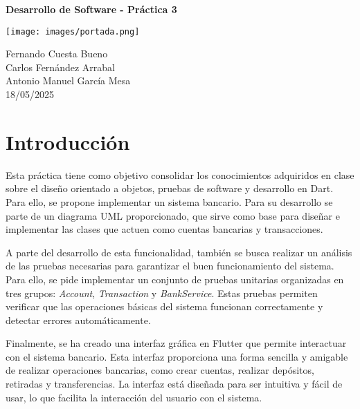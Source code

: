 \documentclass[12pt]{article}
\begin{document}
\begin{titlepage}

    \centering
    \vspace*{1cm}
    \vspace{0.5cm}
    {\Huge\bfseries Desarrollo de Software - Práctica 3\par}
    \vspace{1.5cm}
    \texttt{[image: images/portada.png]}
    \vspace{1.5cm}
    \par %
    \vspace{1cm}
    {\Large Fernando Cuesta Bueno
        \\
        Carlos Fernández Arrabal
        \\
        Antonio Manuel García Mesa
        \\
        18/05/2025\par}

\end{titlepage}

\tableofcontents

\newpage


\section{Introducción}
\setlength{\parindent}{0pt}
Esta práctica tiene como objetivo consolidar los conocimientos adquiridos en clase sobre el diseño orientado a objetos, pruebas de software y desarrollo en Dart. Para ello, se propone implementar un sistema bancario. Para su desarrollo se parte de un diagrama UML proporcionado, que sirve como base para diseñar e implementar las clases que actuen como cuentas bancarias y transacciones.

\vspace{0.2cm}
A parte del desarrollo de esta funcionalidad, también se busca realizar un análisis de las pruebas necesarias para garantizar el buen funcionamiento del sistema. Para ello, se pide implementar un conjunto de pruebas unitarias organizadas en tres grupos: \textit{Account}, \textit{Transaction} y \textit{BankService}. Estas pruebas permiten verificar que las operaciones básicas del sistema funcionan correctamente y detectar errores automáticamente.
\vspace{0.2cm}

Finalmente, se ha creado una interfaz gráfica en Flutter que permite interactuar con el sistema bancario. Esta interfaz proporciona una forma sencilla y amigable de realizar operaciones bancarias, como crear cuentas, realizar depósitos, retiradas y transferencias. La interfaz está diseñada para ser intuitiva y fácil de usar, lo que facilita la interacción del usuario con el sistema.
\end{document}
